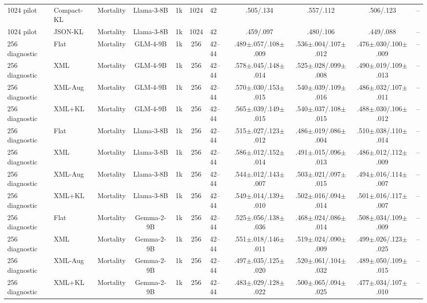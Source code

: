 \begin{table}[t]
{\begin{tabular}{lllccclcccc}
\midrule
1024 pilot & Compact-KL & Mortality & Llama-3-8B & 1k & 1024 & 42 & .505/.134 & .557/.112 & .506/.123 & -- \\
1024 pilot & JSON-KL & Mortality & Llama-3-8B & 1k & 1024 & 42 & .459/.097 & .480/.106 & .449/.088 & -- \\
\midrule
256 diagnostic & Flat & Mortality & GLM-4-9B & 1k & 256 & 42--44 & .489$\pm$.057/.108$\pm$.009 & .536$\pm$.004/.107$\pm$.012 & .476$\pm$.030/.100$\pm$.009 & -- \\
256 diagnostic & XML & Mortality & GLM-4-9B & 1k & 256 & 42--44 & .578$\pm$.045/.148$\pm$.014 & .525$\pm$.028/.099$\pm$.008 & .490$\pm$.019/.109$\pm$.013 & -- \\
256 diagnostic & XML-Aug & Mortality & GLM-4-9B & 1k & 256 & 42--44 & .570$\pm$.030/.153$\pm$.015 & .540$\pm$.039/.109$\pm$.016 & .486$\pm$.032/.107$\pm$.011 & -- \\
256 diagnostic & XML+KL & Mortality & GLM-4-9B & 1k & 256 & 42--44 & .565$\pm$.039/.149$\pm$.015 & .540$\pm$.037/.108$\pm$.015 & .488$\pm$.030/.106$\pm$.012 & -- \\
256 diagnostic & Flat & Mortality & Llama-3-8B & 1k & 256 & 42--44 & .515$\pm$.027/.123$\pm$.012 & .486$\pm$.019/.086$\pm$.004 & .510$\pm$.038/.110$\pm$.014 & -- \\
256 diagnostic & XML & Mortality & Llama-3-8B & 1k & 256 & 42--44 & .586$\pm$.012/.152$\pm$.014 & .491$\pm$.015/.096$\pm$.013 & .486$\pm$.012/.112$\pm$.009 & -- \\
256 diagnostic & XML-Aug & Mortality & Llama-3-8B & 1k & 256 & 42--44 & .544$\pm$.012/.143$\pm$.007 & .503$\pm$.021/.097$\pm$.015 & .494$\pm$.016/.114$\pm$.007 & -- \\
256 diagnostic & XML+KL & Mortality & Llama-3-8B & 1k & 256 & 42--44 & .549$\pm$.014/.139$\pm$.010 & .502$\pm$.016/.094$\pm$.014 & .501$\pm$.016/.117$\pm$.007 & -- \\
256 diagnostic & Flat & Mortality & Gemma-2-9B & 1k & 256 & 42--44 & .525$\pm$.056/.138$\pm$.036 & .468$\pm$.024/.086$\pm$.014 & .508$\pm$.034/.109$\pm$.009 & -- \\
256 diagnostic & XML & Mortality & Gemma-2-9B & 1k & 256 & 42--44 & .551$\pm$.018/.146$\pm$.011 & .519$\pm$.024/.090$\pm$.009 & .499$\pm$.026/.123$\pm$.025 & -- \\
256 diagnostic & XML-Aug & Mortality & Gemma-2-9B & 1k & 256 & 42--44 & .497$\pm$.035/.125$\pm$.020 & .520$\pm$.061/.104$\pm$.032 & .489$\pm$.050/.109$\pm$.015 & -- \\
256 diagnostic & XML+KL & Mortality & Gemma-2-9B & 1k & 256 & 42--44 & .483$\pm$.029/.128$\pm$.022 & .500$\pm$.065/.094$\pm$.025 & .477$\pm$.034/.107$\pm$.010 & -- \\
\bottomrule
\end{tabular}%
}
\end{table}
